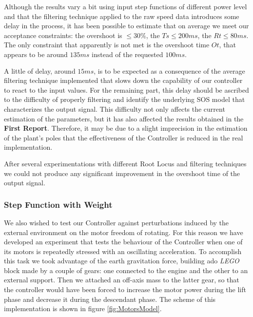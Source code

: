 Although the results vary a bit using input step functions of different power level and that the filtering technique applied to the raw speed data introduces some delay in the process, it has been possible to estimate that on average we meet our acceptance constraints: the overshoot is $\leq 30\%$, the $Ts \leq 200 ms$, the $Rt \leq 80 ms$. The only constraint that apparently is not met is the overshoot time $Ot$, that appears to be around $135 ms$ instead of the requested $100 ms$.


A little of delay, around $15 ms$, is to be expected as a consequence of the average filtering technique implemented that slows down the capability of our controller to react to the input values. For the remaining part, this delay should be ascribed to the difficulty of properly filtering and identify the underlying SOS model that characterizes the output signal. This difficulty not only affects the current estimation of the parameters, but it has also affected the results obtained in the \textbf{First Report}. Therefore, it may be due to a slight imprecision in the estimation of the plant's poles that the effectiveness of the Controller is reduced in the real implementation.

After several experimentations with different Root Locus and filtering techniques we could not produce any significant improvement in the overshoot time of the output signal.

\subsubsection*{Step Function with Weight}

We also wished to test our Controller against perturbations induced by the external environment on the motor freedom of rotating. For this reason we have developed an experiment that tests the behaviour of the Controller when one of its motors is repeatedly stressed with an oscillating acceleration. To accomplish this task we took advantage of the earth gravitation force, building ado \emph{LEGO} block made by a couple of gears: one connected to the engine and the other to an external support. Then we attached an off-axis mass to the latter gear, so that the controller would have been forced to increase the motor power during the lift phase and decrease it during the descendant phase. The scheme of this implementation is shown in figure \ref{fig:MotorsModel}.

